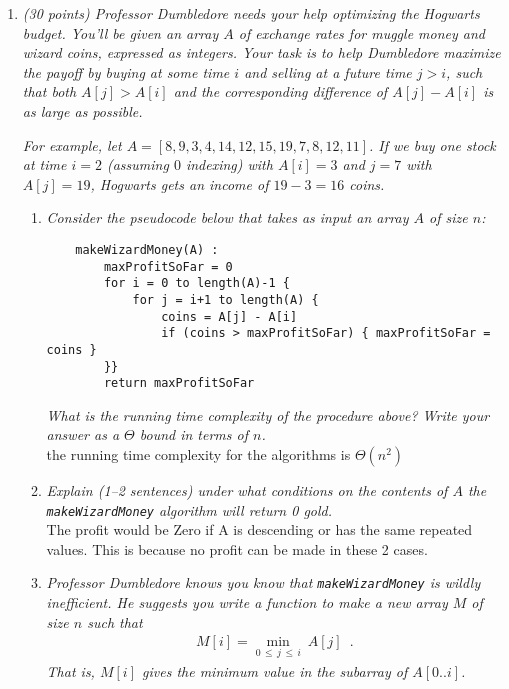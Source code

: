 \documentclass[12pt]{article}
\begin{document}
\begin{enumerate}
    \pagebreak


	\item \textit{(30 points) Professor Dumbledore needs your help optimizing the Hogwarts budget. You'll be given an array $A$ of exchange rates for muggle money and wizard coins, expressed as integers. Your task is to help Dumbledore maximize the payoff by buying at some time $i$ and selling at a future time $j > i$, such that both $A[j] > A[i]$ and the corresponding difference of $A[j]-A[i]$ is as large as possible.}

	\textit{For example, let $A=[8, 9, 3, 4, 14, 12, 15, 19, 7, 8, 12, 11]$. If we buy one stock at time $i=2$ (assuming $0$ indexing) with $A[i]=3$ and $j=7$ with $A[j]=19$, Hogwarts gets an income of $19-3=16$ coins.}

	\begin{enumerate}
	\item \textit{\label{stocks:a} Consider the pseudocode below that takes as input an array $A$ of size $n$:}
	\begin{small}
	\begin{verbatim}
	makeWizardMoney(A) :
	    maxProfitSoFar = 0
	    for i = 0 to length(A)-1 {
	        for j = i+1 to length(A) {
	            coins = A[j] - A[i]
	            if (coins > maxProfitSoFar) { maxProfitSoFar = coins }
	    }}
	    return maxProfitSoFar
	\end{verbatim}
	\end{small}
	\textit{What is the running time complexity of the procedure above? Write your answer as a $\Theta$ bound in terms of $n$.}
\\ 

the running time complexity for the algorithms is $\Theta(n^2)$\\

	\item\textit{ \label{stocks:b} Explain (1--2 sentences) under what conditions on the contents of $A$ the {\tt makeWizardMoney} algorithm will return 0 gold.}
\\
The profit would be Zero if A is descending or has the same repeated values. This is because no profit can be made in these 2 cases.


	\item\textit{ \label{stocks:c} Professor Dumbledore knows you know that {\tt makeWizardMoney} is wildly inefficient. He suggests you write a function to make a new array $M$ of size $n$ such that}
	\begin{align}
	M[i] = \min_{0\,\leq\, j\, \leq \,i} ~A[j] \nonumber \enspace .
	\end{align}
	\textit{That is, $M[i]$ gives the minimum value in the subarray of $A[0 .. i]$.}


\end{enumerate}
\end{enumerate}
\end{document}
